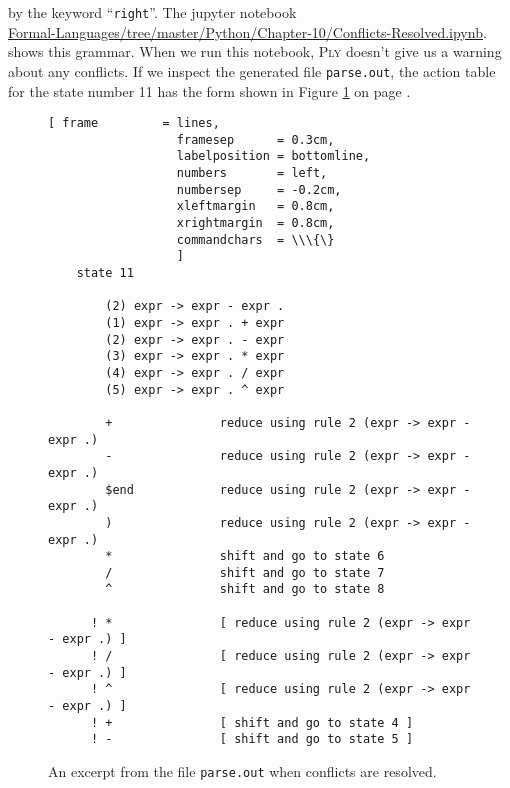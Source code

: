 by the keyword ``\texttt{right}''.
The jupyter notebook
\\[0.2cm]
\hspace*{1.3cm}
\href{https://github.com/karlstroetmann/Formal-Languages/tree/master/Python/Chapter-10/Conflicts-Resolved.ipynb}{Formal-Languages/tree/master/Python/Chapter-10/Conflicts-Resolved.ipynb}.
\\[0.2cm]
shows this grammar.  When we run this notebook, \textsc{Ply} doesn't give us a
warning about any conflicts.  If we inspect the generated file \texttt{parse.out}, the action table for the
state number 11 has the form shown in Figure \ref{fig:Conflicts-Resolved.ipynb:state11} on page
\pageref{fig:Conflicts-Resolved.ipynb:state11}.

\begin{figure}[!ht]
\centering
\begin{Verbatim}[ frame         = lines, 
                  framesep      = 0.3cm, 
                  labelposition = bottomline,
                  numbers       = left,
                  numbersep     = -0.2cm,
                  xleftmargin   = 0.8cm,
                  xrightmargin  = 0.8cm,
                  commandchars  = \\\{\}
                  ]
    state 11
    
        (2) expr -> expr - expr .
        (1) expr -> expr . + expr
        (2) expr -> expr . - expr
        (3) expr -> expr . * expr
        (4) expr -> expr . / expr
        (5) expr -> expr . ^ expr
    
        +               reduce using rule 2 (expr -> expr - expr .)
        -               reduce using rule 2 (expr -> expr - expr .)
        $end            reduce using rule 2 (expr -> expr - expr .)
        )               reduce using rule 2 (expr -> expr - expr .)
        *               shift and go to state 6
        /               shift and go to state 7
        ^               shift and go to state 8
    
      ! *               [ reduce using rule 2 (expr -> expr - expr .) ]
      ! /               [ reduce using rule 2 (expr -> expr - expr .) ]
      ! ^               [ reduce using rule 2 (expr -> expr - expr .) ]
      ! +               [ shift and go to state 4 ]
      ! -               [ shift and go to state 5 ]                  
\end{Verbatim} 
\vspace*{-0.3cm}
\caption{An excerpt from the file \texttt{parse.out} when conflicts are resolved.}
\label{fig:Conflicts-Resolved.ipynb:state11}
\end{figure} %

